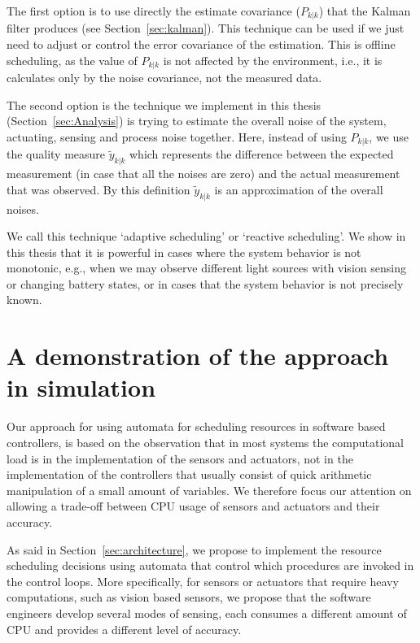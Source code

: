 \documentclass[ twoside, 12pt ]{article}
\begin{document}
The first option is to use directly the estimate covariance ($P_{k|k}$) that the Kalman filter produces (see Section~\ref{sec:kalman}). This technique can be used if we just need to adjust or control the error covariance of the estimation. This is offline scheduling, as the value of $P_{k|k}$ is not affected by the environment, i.e., it is calculates only by the noise covariance, not the measured data.
    
The second option is the technique we implement in this thesis (Section~\ref{sec:Analysis}) is trying to estimate the overall noise of the system, actuating, sensing and process noise together. Here, instead of using $P_{k|k}$, we use the quality measure $\tilde{y}_{k|k}$ which represents the difference between the expected measurement (in case that all the noises are zero) and the actual measurement that was observed. By this definition $\tilde{y}_{k|k}$ is an approximation of the overall noises.
    
We call this technique `adaptive scheduling' or `reactive scheduling'. We show in this thesis that it is powerful in cases where the system behavior is not monotonic, e.g., when we may observe different light sources with vision sensing or changing battery states, or in cases that the system behavior is not precisely known.


\section{A demonstration of the approach in simulation}
\label{sec:simulation}

Our approach for using automata for scheduling resources in software based controllers, is based on the observation that in most systems the computational load is in the implementation of the sensors and actuators, not in the implementation of the controllers that usually consist of quick arithmetic manipulation of a small amount of variables. We therefore focus our attention on allowing a trade-off between CPU usage of sensors and actuators and their accuracy. %

As said in Section~\ref{sec:architecture}, we propose to implement the resource scheduling decisions using automata that control which procedures are invoked in the control loops. More specifically, for sensors or actuators that require heavy computations, such as vision based sensors, we propose that the software engineers develop several modes of sensing, each consumes a different amount of CPU and provides a different level of accuracy. 
\end{document}
